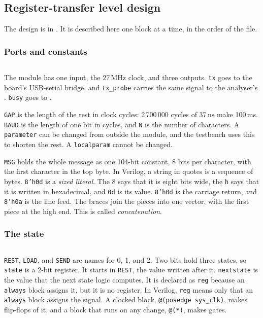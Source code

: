 \documentclass[11pt,a4paper]{article}
\begin{document}
\subsection*{Register-transfer level design}

The design is in . It is described here one block at a time, in the order of the file.

\subsubsection*{Ports and constants}

\inputminted[firstline=6, lastline=16]{verilog}{../rtl/hello/hello.v}

The module has one input, the 27\,MHz clock, and three outputs. \texttt{tx} goes to the board’s USB-serial bridge, and \texttt{tx\_probe} carries the same signal to the analyser’s . \texttt{busy} goes to .

\texttt{GAP} is the length of the rest in clock cycles: 2\,700\,000 cycles of 37\,ns make 100\,ms. \texttt{BAUD} is the length of one bit in cycles, and \texttt{N} is the number of characters. A \texttt{parameter} can be changed from outside the module, and the testbench uses this to shorten the rest. A \texttt{localparam} cannot be changed.

\texttt{MSG} holds the whole message as one 104-bit constant, 8 bits per character, with the first character in the top byte. In Verilog, a string in quotes is a sequence of bytes. \texttt{8'h0d} is a \emph{sized literal}. The 8 says that it is eight bits wide, the \texttt{h} says that it is written in hexadecimal, and \texttt{0d} is its value. \texttt{8'h0d} is the carriage return, and \texttt{8'h0a} is the line feed. The braces join the pieces into one vector, with the first piece at the high end. This is called \emph{concatenation}.

\subsubsection*{The state}

\inputminted[firstline=18, lastline=19]{verilog}{../rtl/hello/hello.v}

\texttt{REST}, \texttt{LOAD}, and \texttt{SEND} are names for 0, 1, and 2. Two bits hold three states, so \texttt{state} is a 2-bit register. It starts in \texttt{REST}, the value written after it. \texttt{nextstate} is the value that the next state logic computes. It is declared as \texttt{reg} because an \texttt{always} block assigns it, but it is no register. In Verilog, \texttt{reg} means only that an \texttt{always} block assigns the signal. A clocked block, \texttt{@(posedge sys\_clk)}, makes flip-flops of it, and a block that runs on any change, \texttt{@(*)}, makes gates.
\end{document}
